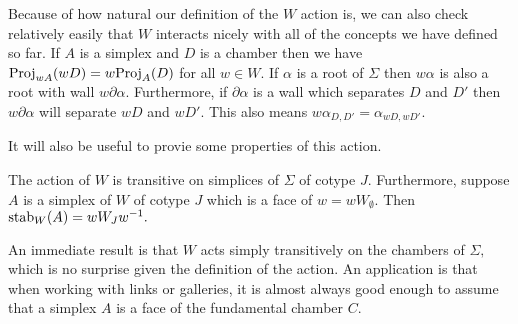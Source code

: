 \documentclass[class=book, crop=false,12 pt]{standalone}
\begin{document}
Because of how natural our definition of the $W$ action is, we can also check relatively easily that $W$ interacts nicely with all of the concepts we have defined so far. If $A$ is a simplex and $D$ is a chamber then we have $\mathrm{Proj}_{wA}(wD)=w\mathrm{Proj}_{A}(D)$ for all $w\in W.$ If $\alpha$ is a root of $\Sigma$ then $w\alpha$ is also a root with wall $w\partial\alpha.$ Furthermore, if $\partial\alpha$ is a wall which separates $D$ and $D'$ then $w\partial\alpha$ will separate $wD$ and $wD'.$ This also means $w\alpha_{D,D'}=\alpha_{wD,wD'}.$ 

It will also be useful to provie some properties of this action.
\begin{theorem}
	\label{thm:stabW}
	The action of $W$ is transitive on simplices of $\Sigma$ of cotype $J.$ Furthermore, suppose $A$ is a simplex of $W$ of cotype $J$ which is a face of $w=wW_{\emptyset}.$ Then $\mathrm{stab}_W(A)=wW_Jw^{-1}.$
\end{theorem}

An immediate result is that $W$ acts simply transitively on the chambers of $\Sigma,$ which is no surprise given the definition of the action. An application is that when working with links or galleries, it is almost always good enough to assume that a simplex $A$ is a face of the fundamental chamber $C.$
\end{document}
